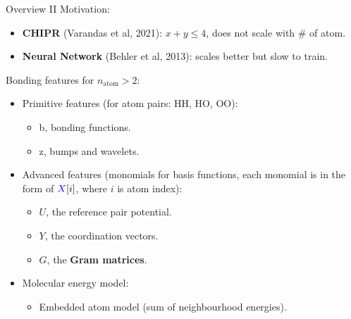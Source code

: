 \documentclass{beamer}
\begin{document}
\begin{frame}{Overview II}
    Motivation:
    \begin{itemize}
        \item \textbf{CHIPR} (Varandas et al, 2021): $x+y \leq 4$, does not scale with \# of atom.
        \item \textbf{Neural Network} (Behler et al, 2013): scales better but slow to train.
    \end{itemize}
    Bonding features for $n_\text{atom} > 2$:
    \begin{itemize}
        \item Primitive features (for atom pairs: HH, HO, OO):
        \begin{itemize}
            \item {\color{olive}b}, bonding functions.
            \item {\color{olive}z}, bumps and wavelets.
        \end{itemize}
        \item Advanced features (monomials for basis functions, each monomial is in the form of ${\color{blue}X}[i]$, where $i$ is atom index):
        \begin{itemize}
            \item {\color{blue}$U$}, the reference pair potential.
            \item {\color{blue}$Y$}, the coordination vectors.
            \item {\color{blue}$G$}, the \textbf{Gram matrices}.
        \end{itemize}
        \item Molecular energy model:
        \begin{itemize}
            \item Embedded atom model (sum of neighbourhood energies).
        \end{itemize}
    \end{itemize}
    
\end{frame}

\end{document}
